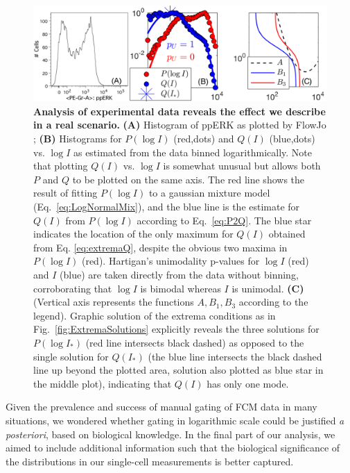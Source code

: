 \documentclass[11pt,a4paper,final]{article}
\begin{document}
\begin{figure}[!ht]
 \centering
  \includegraphics[width=1\linewidth]{Fig3.png}
  \caption{\textbf{Analysis of experimental data reveals the effect we describe in a real scenario. }\textbf{(A)} Histogram of ppERK as plotted by FlowJo \cite{FlowJo}; \textbf{(B)} Histograms for $P(\log I)$ (red,dots) and $Q(I)$ (blue,dots) vs. $\log I$ as estimated from the data binned logarithmically. Note that plotting $Q(I)$ vs. $\log I$ is somewhat unusual but allows both $P$ and $Q$ to be plotted on the same axis. The red line shows the result of fitting $P(\log I)$ to a gaussian mixture model (Eq.~\ref{eq:LogNormalMix}), and the blue line is the estimate for $Q(I)$ from $P(\log I)$ according to Eq.~\ref{eq:P2Q}. The blue star indicates the location of the only maximum for $Q(I)$ obtained from Eq. \ref{eq:extremaQ}, despite the obvious two maxima in $P(\log I)$ (red). Hartigan's unimodality p-values for $\log I$ (red) and $I$ (blue) are taken directly from the data without binning, corroborating that $\log I$ is bimodal whereas $I$ is unimodal. \textbf{(C)} (Vertical axis represents the functions $A, B_1,B_3$ according to the legend). Graphic solution of the extrema conditions as in Fig.~\ref{fig:ExtremaSolutions} explicitly reveals the three solutions for $P(\log I_*)$ (red line intersects black dashed) as opposed to the single solution for $Q(I_*)$ (the blue line intersects the black dashed line up beyond the plotted area, solution also plotted as blue star in the middle plot), indicating that $Q(I)$ has only one mode.}
  \label{fig:Experiment}
\end{figure}
Given the prevalence and success of manual gating of FCM data in many situations, we wondered whether gating in logarithmic scale could be justified \emph{a posteriori}, based on biological knowledge. In the final part of our analysis, we aimed to include additional information such that the biological significance of the distributions in our single-cell measurements is better captured. 
\end{document}

